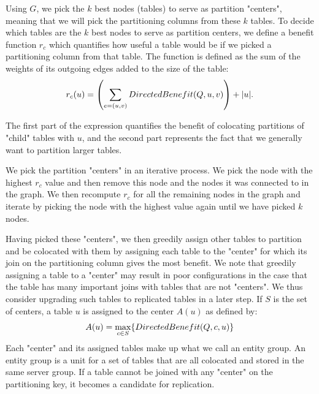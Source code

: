 Using $G$, we pick the $k$ best nodes (tables) to serve as partition "centers", meaning that we will pick the partitioning columns from these $k$ tables. To decide which tables are the $k$ best nodes to serve as partition centers, we define a benefit function $r_c$ which quantifies how useful a table would be if we picked a partitioning column from that table.
The function is defined as the sum of the weights of its outgoing edges added to the size of the table:
\vspace*{-8pt}
\begin{equation}
r_c(u) = \left( \sum_{e = (u,v)} DirectedBenefit(Q,u,v) \right) + |u|.
\vspace*{-7pt}
\end{equation}

The first part of the expression quantifies the benefit of colocating partitions of "child" tables with $u$, and the second part represents the fact that we generally want to partition larger tables. 

We pick the partition "centers" in an iterative process. We pick the node with the highest $r_c$ value and then remove this node and the nodes it was connected to in the graph. We then recompute $r_c$ for all the remaining nodes in the graph and iterate by picking the node with the highest value again until we have picked $k$ nodes.

Having picked these "centers", we then greedily assign other tables to partition and be colocated with them by assigning each table to the "center" for which its join on the partitioning column gives the most benefit.  We note that greedily assigning a table to a "center" may result in poor configurations in the case that the table has many important joins with tables that are not "centers".  We thus consider upgrading such tables to replicated tables in a later step.  If $S$ is the set of centers, a table $u$ is assigned to the center $A(u)$ as defined by:
\vspace*{-6pt}
\begin{equation}
A(u) = \max_{c \in S} \{DirectedBenefit(Q, c, u)\}
\vspace*{-6pt}
\end{equation}
Each "center" and its assigned tables make up what we call an entity group. An entity group is a unit for a set of tables that are all colocated and stored in the same server group.  If a table cannot be joined with any "center" on the partitioning key, it becomes a candidate for replication.

